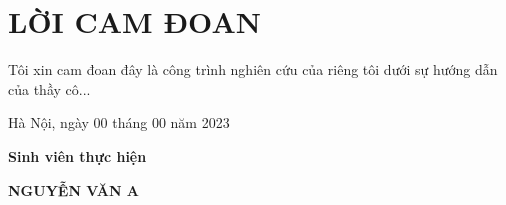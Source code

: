 \section*{LỜI CAM ĐOAN}
\thispagestyle{empty}
Tôi xin cam đoan đây là công trình nghiên cứu của riêng tôi dưới sự hướng dẫn của thầy cô...

\vspace{6pt}
\hspace{7cm}Hà Nội, ngày 00 tháng 00 năm 2023

\hspace{9cm}\textbf{Sinh viên thực hiện}

\vspace{2cm}
\hspace{8.3cm}\textbf{NGUYỄN VĂN A}
\cleardoublepage
